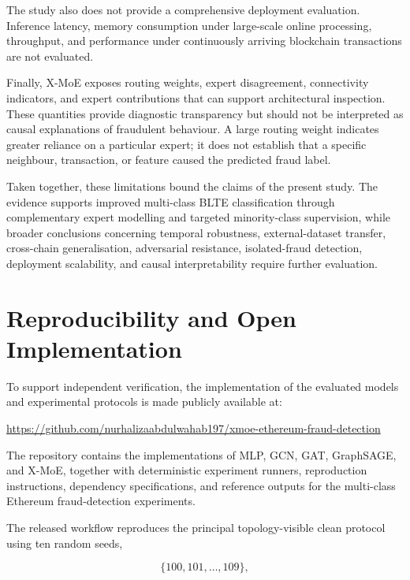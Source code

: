 \documentclass{ieeeaccess}
\begin{document}
The study also does not provide a comprehensive deployment evaluation. Inference latency, memory consumption under large-scale online processing, throughput, and performance under continuously arriving blockchain transactions are not evaluated.

Finally, X-MoE exposes routing weights, expert disagreement, connectivity indicators, and expert contributions that can support architectural inspection. These quantities provide diagnostic transparency but should not be interpreted as causal explanations of fraudulent behaviour. A large routing weight indicates greater reliance on a particular expert; it does not establish that a specific neighbour, transaction, or feature caused the predicted fraud label.

Taken together, these limitations bound the claims of the present study. The evidence supports improved multi-class BLTE classification through complementary expert modelling and targeted minority-class supervision, while broader conclusions concerning temporal robustness, external-dataset transfer, cross-chain generalisation, adversarial resistance, isolated-fraud detection, deployment scalability, and causal interpretability require further evaluation.



\section{Reproducibility and Open Implementation}

To support independent verification, the implementation of the evaluated models and experimental protocols is made publicly available at:

\begin{center}
\url{https://github.com/nurhalizaabdulwahab197/xmoe-ethereum-fraud-detection}
\end{center}

The repository contains the implementations of MLP, GCN, GAT, GraphSAGE, and X-MoE, together with deterministic experiment runners, reproduction instructions, dependency specifications, and reference outputs for the multi-class Ethereum fraud-detection experiments.

The released workflow reproduces the principal topology-visible clean protocol using ten random seeds,

\begin{equation}
\{100,101,\ldots,109\},
\end{equation}
\end{document}
